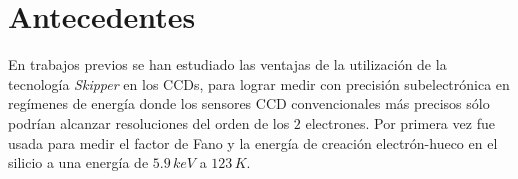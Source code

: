     

\section{Antecedentes \label{sec:Antecedentes}}
\noindent En trabajos previos se han estudiado las ventajas de la utilización de la tecnología \textit{Skipper} en los CCDs, para lograr medir con precisión subelectrónica en regímenes de energía donde los sensores CCD convencionales más precisos sólo podrían alcanzar resoluciones del orden de los $2$ electrones. Por primera vez fue usada para medir el factor de Fano y la energía de creación electrón-hueco en el silicio a una energía de $5.9\,\si{keV}$ a $123\,\si{K}$\cite{Rodrigues}.


